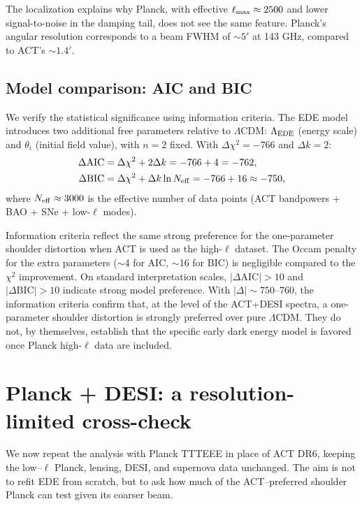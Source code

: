 \documentclass[twocolumn,showpacs,preprintnumbers,amsmath,amssymb,prd]{revtex4-2}
\newcommand{\lcdm}{$\Lambda$CDM}
\begin{document}
The localization explains why Planck, with effective $\ell_{\rm max} 
\approx 2500$ and lower signal-to-noise in the damping tail, does not see 
the same feature. Planck's angular resolution corresponds to a beam FWHM 
of $\sim 5'$ at 143 GHz, compared to ACT's $\sim 1.4'$.

\subsection{Model comparison: AIC and BIC}
\label{sec:aic_bic}

We verify the statistical significance using information criteria. The 
EDE model introduces two additional free parameters relative to \lcdm: 
$\Lambda_{\rm EDE}$ (energy scale) and $\theta_i$ (initial field value), 
with $n = 2$ fixed. With $\Delta\chi^2 = -766$ and $\Delta k = 2$:
\begin{align}
\Delta\text{AIC} &= \Delta\chi^2 + 2\Delta k = -766 + 4 = -762, \\
\Delta\text{BIC} &= \Delta\chi^2 + \Delta k \ln N_{\rm eff} = -766 + 16 \approx -750,
\end{align}
where $N_{\rm eff} \approx 3000$ is the effective number of data points 
(ACT bandpowers + BAO + SNe + low-$\ell$ modes).

Information criteria reflect the same strong preference for the one-parameter 
shoulder distortion when ACT is used as the high-$\ell$ dataset. 
The Occam penalty for the extra parameters ($\sim$4 for AIC, $\sim$16 for BIC) 
is negligible compared to the $\chi^2$ improvement. On standard interpretation 
scales, $|\Delta\text{AIC}| > 10$ and $|\Delta\text{BIC}| > 10$ indicate 
strong model preference. With $|\Delta| \sim 750$--$760$, the information 
criteria confirm that, at the level of the ACT+DESI spectra, a one-parameter 
shoulder distortion is strongly 
preferred over pure \lcdm. They do not, by themselves, establish that the 
specific early dark energy model is favored once Planck high-$\ell$ data 
are included.

\section{Planck + DESI: a resolution-limited cross-check}
\label{sec:planck}

We now repeat the analysis with Planck TTTEEE in place of ACT DR6, keeping the
low--$\ell$ Planck, lensing, DESI, and supernova data unchanged. The aim is not
to refit EDE from scratch, but to ask how much of the ACT--preferred shoulder
Planck can test given its coarser beam.
\end{document}
